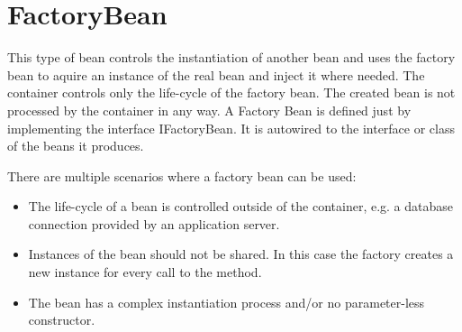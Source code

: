 \section{FactoryBean}
\label{feature:FactoryBean}
\ClearAPI

This type of bean controls the instantiation of another bean and \AMBETH{} uses the factory bean to aquire an instance of the real bean and inject it where needed. The container controls only the life-cycle of the factory bean. The created bean is not processed by the container in any way. A Factory Bean is defined just by implementing the interface IFactoryBean. It is autowired to the interface or class of the beans it produces.

There are multiple scenarios where a factory bean can be used:

\begin{itemize}
	\item The life-cycle of a bean is controlled outside of the container, e.g. a database connection provided by an application server.
	\item Instances of the bean should not be shared. In this case the factory creates a new instance for every call to the  method.
	\item The bean has a complex instantiation process and/or no parameter-less constructor.
\end{itemize}

